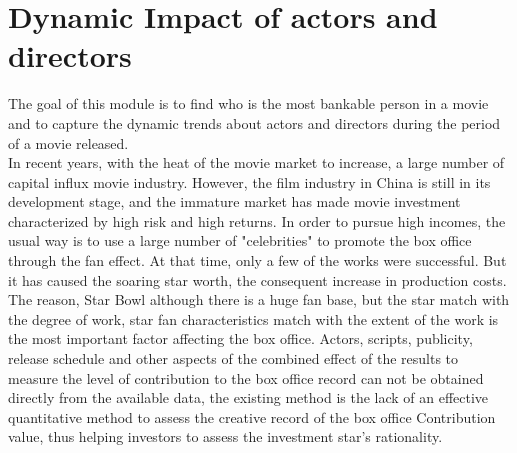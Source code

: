 \section{Dynamic Impact of actors and directors}
The goal of this module is to find who is the most bankable person in a movie and to capture the dynamic trends about actors and directors during the period of a movie released.\\
In recent years, with the heat of the movie market to increase, a large number of capital influx movie industry. However, the film industry in China is still in its development stage, and the immature market has made movie investment characterized by high risk and high returns. In order to pursue high incomes, the usual way is to use a large number of "celebrities" to promote the box office through the fan effect. At that time, only a few of the works were successful. But it has caused the soaring star worth, the consequent increase in production costs. The reason, Star Bowl although there is a huge fan base, but the star match with the degree of work, star fan characteristics match with the extent of the work is the most important factor affecting the box office. Actors, scripts, publicity, release schedule and other aspects of the combined effect of the results to measure the level of contribution to the box office record can not be obtained directly from the available data, the existing method is the lack of an effective quantitative method to assess the creative record of the box office Contribution value, thus helping investors to assess the investment star's rationality.\\
